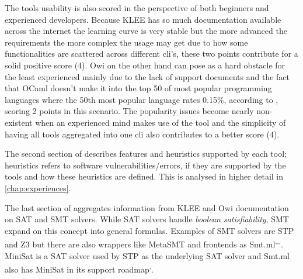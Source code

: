 The tools usability is also scored in the perspective of both beginners and experienced developers. Because KLEE has so much documentation available across the internet the learning curve is very stable but the more advanced the requirements the more complex the usage may get due to how some functionalities are scattered across different \acrshort{cli}'s, these two points contribute for a solid positive score (4). Owi on the other hand can pose as a hard obstacle for the least experienced mainly due to the lack of support documents and the fact that OCaml doesn't make it into the top 50 of most popular programming languages where the 50th most popular language rates 0.15\%, according to \citeauthor{tiobe_index}, scoring 2 points in this scenario. The popularity issues become nearly non-existent when an experienced mind makes use of the tool and the simplicity of having all tools aggregated into one \acrshort{cli} also contributes to a better score (4).

The second section of  describes features and heuristics supported by each tool; heuristics refers to software vulnerabilities/errors, if they are supported by the tools and how these heuristics are defined. This is analysed in higher detail in \cref{chap:experiences}.

The last section of  aggregates information from KLEE and Owi documentation on SAT and SMT solvers. While SAT solvers handle \textit{boolean satisfiability}, SMT expand on this concept into general formulas. Examples of SMT solvers are STP and Z3 but there are also wrappers like MetaSMT and frontends as Smt.ml\textsuperscript{,}\textsuperscript{,}\textsuperscript{,}. MiniSat is a SAT solver used by STP as the underlying SAT solver and Smt.ml also has MiniSat in its support roadmap\textsuperscript{,}\footnotemark[21]%
.

